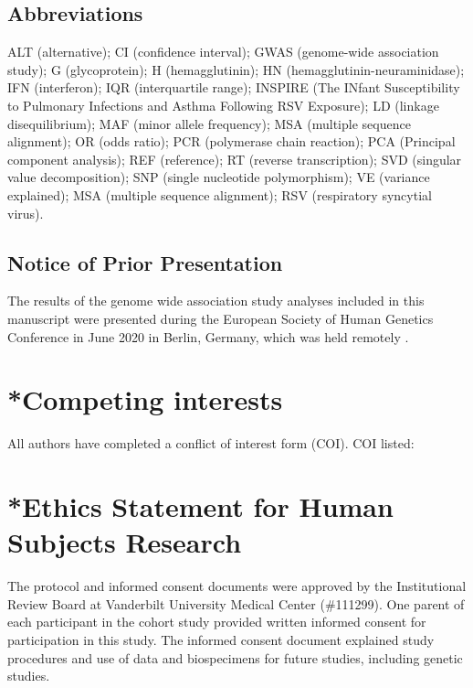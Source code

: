 \documentclass{article} %
\makeatletter
\renewcommand{\maketitle}{\bgroup\setlength{\parindent}{0pt}
\begin{flushleft}
  \textbf{\@title}

  \@author
\end{flushleft}\egroup
}
\makeatother
\begin{document}
\maketitle


\clearpage
\subsection*{Abbreviations}
ALT (alternative);
CI (confidence interval);
GWAS (genome-wide association study);
G (glycoprotein);
H (hemagglutinin);
HN (hemagglutinin-neuraminidase);
IFN (interferon);
IQR (interquartile range);
INSPIRE (The INfant Susceptibility to Pulmonary Infections and Asthma Following RSV Exposure);
LD (linkage disequilibrium);
MAF (minor allele frequency);
MSA (multiple sequence alignment);
OR (odds ratio);
PCR (polymerase chain reaction);
PCA (Principal component analysis);
REF (reference);
RT (reverse transcription);
SVD (singular value decomposition);
SNP (single nucleotide polymorphism);
VE (variance explained);
MSA (multiple sequence alignment);
RSV (respiratory syncytial virus).

\subsection*{Notice of Prior Presentation}
The results of the genome wide association study analyses included in this manuscript were presented during the European Society of Human Genetics Conference in June 2020 in Berlin, Germany, which was held remotely 
\citep{lawless2020genome}.

\section*{*Competing interests}
All authors have completed a conflict of interest form (COI). COI listed:

\section*{*Ethics Statement for Human Subjects Research}
The protocol and informed consent documents were approved by the Institutional Review Board at Vanderbilt University Medical Center (\#111299).  
One parent of each participant in the cohort study provided written informed consent for participation in this study. 
The informed consent document explained study procedures and use of data and biospecimens for future studies, including genetic studies.
\end{document}
